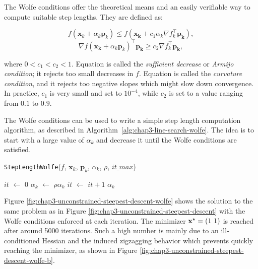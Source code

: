 The Wolfe conditions offer the theoretical means and an easily
verifiable way to compute suitable step lengths. They are defined as:

\begin{equation}
\label{eq:chap3-wolfe-1}
f(\mathbf{x}_k + \alpha_k\mathbf{p}_k) \le
f(\mathbf{x_k}+c_1\alpha_k\nabla f_k^{\top}\mathbf{p_k}),
\end{equation}
\begin{equation}
\label{eq:chap3-wolfe-2}
\nabla f(\mathbf{x_k} + \alpha_k
\mathbf{p}_k)^{\top}\mathbf{p_k} \ge c_2 \nabla f_k^{\top}\mathbf{p_k},
\end{equation}

\noindent where $0 < c_1 < c_2 < 1$. Equation
 is called the \emph{sufficient decrease} or
\emph {Armijo condition}; it rejects too small decreases in
$f$. Equation  is called the \emph{curvature
  condition}, and it rejects too negative slopes which might slow down
convergence. In practice, $c_1$ is very small and set to $10^{-4}$,
while $c_2$ is set to a value ranging from $0.1$ to $0.9$.

The Wolfe conditions can be used to write a simple step length
computation algorithm, as described in
Algorithm~\ref{alg:chap3-line-search-wolfe}. The idea is to start with
a large value of $\alpha_k$ and decrease it until the Wolfe conditions
are satisfied.

\begin{algorithm}
\caption{\texttt{StepLengthWolfe}($f$, $\mathbf{x}_k$, $\mathbf{p}_k$,
  $\alpha_k$, $\rho$, $it\_max$)}
\label{alg:chap3-line-search-wolfe}
\begin{algorithmic}
\STATE $it$ $\leftarrow$ $0$
\STATE $\alpha_k$ $\leftarrow$ $\rho \alpha_k$ 
\STATE $it$ $\leftarrow$ $it + 1$
\ENDWHILE
\RETURN $\alpha_k$
\end{algorithmic}
\end{algorithm}

Figure \ref{fig:chap3-unconstrained-steepest-descent-wolfe} shows the
solution to the same problem as in Figure
\ref{fig:chap3-unconstrained-steepest-descent} with the Wolfe
conditions enforced at each iteration. The minimizer
$\mathbf{x}^{\star}=(1~1)$ is reached after around 5000 iterations. Such a
high number is mainly due to an ill-conditioned Hessian and the
induced zigzagging behavior which prevents quickly reaching the
minimizer, as shown in Figure
\ref{fig:chap3-unconstrained-steepest-descent-wolfe-b}.

